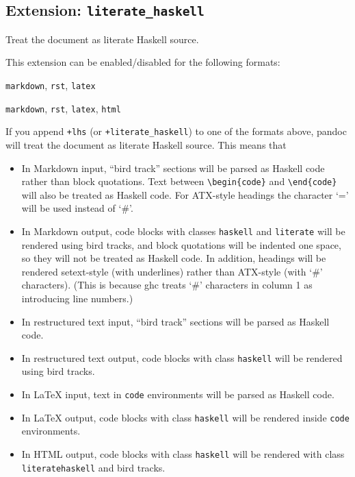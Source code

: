 \documentclass[
  b5paper
]{book}
\providecommand{\tightlist}{%
  \setlength{\itemsep}{0pt}\setlength{\parskip}{0pt}}
\begin{document}
\subsection{\texorpdfstring{Extension:
\texttt{literate\_haskell}}{Extension: literate\_haskell}}\label{extension-literate_haskell}

Treat the document as literate Haskell source.

This extension can be enabled/disabled for the following formats:

\begin{description}
\tightlist
\item[input formats]
\texttt{markdown}, \texttt{rst}, \texttt{latex}
\item[output formats]
\texttt{markdown}, \texttt{rst}, \texttt{latex}, \texttt{html}
\end{description}

If you append \texttt{+lhs} (or \texttt{+literate\_haskell}) to one of
the formats above, pandoc will treat the document as literate Haskell
source. This means that

\begin{itemize}
\item
  In Markdown input, ``bird track'' sections will be parsed as Haskell
  code rather than block quotations. Text between
  \texttt{\textbackslash{}begin\{code\}} and
  \texttt{\textbackslash{}end\{code\}} will also be treated as Haskell
  code. For ATX-style headings the character `=' will be used instead of
  `\#'.
\item
  In Markdown output, code blocks with classes \texttt{haskell} and
  \texttt{literate} will be rendered using bird tracks, and block
  quotations will be indented one space, so they will not be treated as
  Haskell code. In addition, headings will be rendered setext-style
  (with underlines) rather than ATX-style (with `\#' characters). (This
  is because ghc treats `\#' characters in column 1 as introducing line
  numbers.)
\item
  In restructured text input, ``bird track'' sections will be parsed as
  Haskell code.
\item
  In restructured text output, code blocks with class \texttt{haskell}
  will be rendered using bird tracks.
\item
  In LaTeX input, text in \texttt{code} environments will be parsed as
  Haskell code.
\item
  In LaTeX output, code blocks with class \texttt{haskell} will be
  rendered inside \texttt{code} environments.
\item
  In HTML output, code blocks with class \texttt{haskell} will be
  rendered with class \texttt{literatehaskell} and bird tracks.
\end{itemize}
\end{document}
